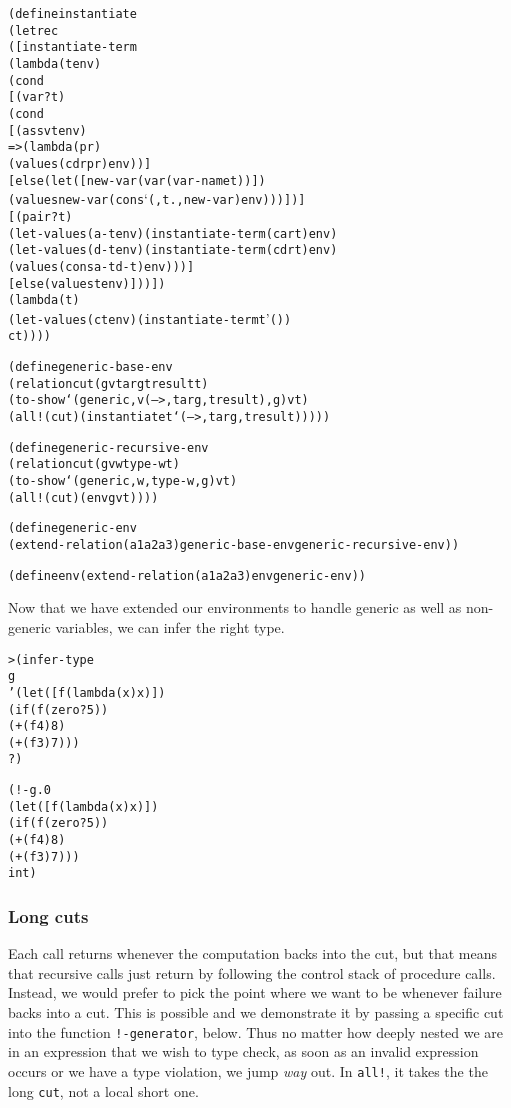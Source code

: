 \begin{alltt}
(define instantiate
  (letrec
    ([instantiate-term
       (lambda (t env)
         (cond
           [(var? t)
            (cond
              [(assv t env)
               => (lambda (pr)
                    (values (cdr pr) env))]
              [else (let ([new-var (var (var-name t))])
                      (values new-var (cons `(,t . ,new-var) env)))])]
           [(pair? t)
            (let-values (a-t env) (instantiate-term (car t) env)
              (let-values (d-t env) (instantiate-term (cdr t) env)
                (values (cons a-t d-t) env)))]
           [else (values t env)]))])
    (lambda (t)
      (let-values (ct env) (instantiate-term t '())
        ct))))
\end{alltt}
\newpage
\begin{alltt}
(define generic-base-env
  (relation cut (g v targ tresult t)
    (to-show `(generic ,v (--> ,targ ,tresult) ,g) v t)
    (all! (cut) (instantiate t `(--> ,targ ,tresult)))))

(define generic-recursive-env
  (relation cut (g v w type-w t)
    (to-show `(generic ,w ,type-w ,g) v t)
    (all! (cut) (env g v t))))

(define generic-env
  (extend-relation (a1 a2 a3) generic-base-env generic-recursive-env))

(define env (extend-relation (a1 a2 a3) env generic-env))
\end{alltt}

Now that we have extended our environments to handle generic
as well as non-generic variables, we can infer the right type.

\begin{alltt}
> (infer-type 
    g
    '(let ([f (lambda (x) x)])
       (if (f (zero? 5))
         (+ (f 4) 8)
         (+ (f 3) 7)))
    ?)

(!- g.0
    (let ([f (lambda (x) x)])
      (if (f (zero? 5))
        (+ (f 4) 8)
        (+ (f 3) 7)))
    int)
\end{alltt}

\subsubsection{Long cuts}
Each call returns whenever the computation backs into the cut, but
that means that recursive calls just return by following the control
stack of procedure calls.  Instead, we would prefer to pick the point
where we want to be whenever failure backs into a cut.  This is
possible and we demonstrate it by passing a specific cut into the
function \texttt{!-generator}, below.  Thus no matter how deeply
nested we are in an expression that we wish to type check, as soon as
an invalid expression occurs or we have a type violation, we jump
\emph{way} out.  In \texttt{all!}, it takes the
the long \texttt{cut}, not a local short one.

